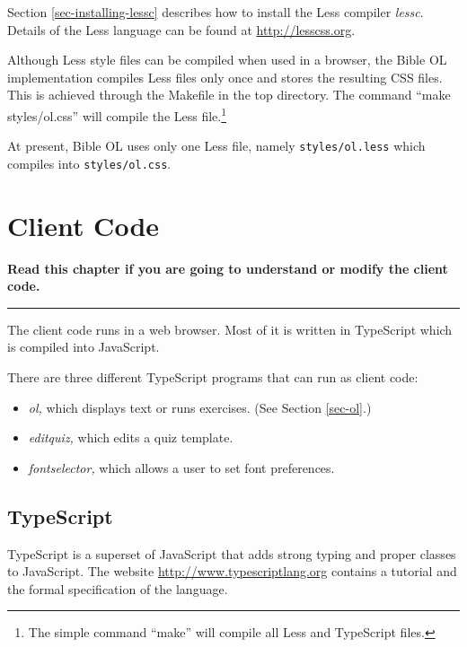 \documentclass[11pt,oneside,a4paper]{memoir}
\begin{document}
\lstset{frame=tb} %


Section \ref{sec-installing-lessc} describes how to install the Less compiler \emph{lessc}. Details of
the Less language can be found at \url{http://lesscss.org}.

Although Less style files can be compiled when used in a browser, the Bible OL implementation
compiles Less files only once and stores the resulting CSS files. This is achieved through the
Makefile in the top directory. The command ``make styles/ol.css'' will compile the Less
file.\footnote{The simple command ``make'' will compile all Less and TypeScript files.}

At present, Bible OL uses only one Less file, namely \texttt{styles/ol.less} which compiles into
\texttt{styles/ol.css}.

\chapter{Client Code}\label{chap-client-code}

\textbf{Read this chapter if you are going to understand or modify the client code.}
\plainbreak{3}

The client code runs in a web browser. Most of it is written in TypeScript which is compiled into
JavaScript. 

There are three different TypeScript programs that can run as client code:


\begin{itemize}
\item \emph{ol,} which displays text or runs exercises. (See Section \ref{sec-ol}.)
\item \emph{editquiz,} which edits a quiz template.
\item \emph{fontselector,} which allows a user to set font preferences.
\end{itemize}

\section{TypeScript}\label{sec-typescript-use}

TypeScript is a superset of JavaScript that adds strong typing and proper classes to JavaScript.
The website \url{http://www.typescriptlang.org} contains a tutorial and the formal specification of
the language.
\end{document}
